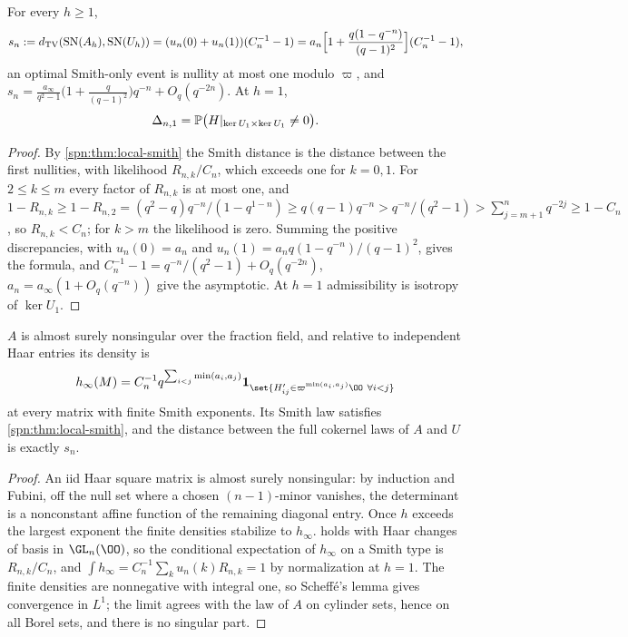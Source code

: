 \begin{corollary}\label{spn:cor:local-smith-tv}
For every $h\ge1$,
\[
 s_n:=d_{\mathrm{TV}}(\mathrm{SN}(A_h),\mathrm{SN}(U_h))=(u_n(0)+u_n(1))(C_n^{-1}-1)
 =a_n\Bigl[1+\frac{q(1-q^{-n})}{(q-1)^2}\Bigr](C_n^{-1}-1),
\]
an optimal Smith-only event is nullity at most one modulo $\varpi$, and
$s_n=\frac{a_\infty}{q^2-1}\bigl(1+\frac q{(q-1)^2}\bigr)q^{-n}+O_q(q^{-2n})$. At $h=1$,
\begin{equation}\label{spn:eq:local-field}
 \Delta_{n,1}=\mathbb{P}\bigl(H|_{\ker U_1\times\ker U_1}\ne0\bigr).
\end{equation}
\end{corollary}
\begin{proof}
By \cref{spn:thm:local-smith} the Smith distance is the distance between the first nullities, with
likelihood $R_{n,k}/C_n$, which exceeds one for $k=0,1$. For $2\le k\le m$ every factor of $R_{n,k}$ is
at most one, and
$1-R_{n,k}\ge1-R_{n,2}=(q^2-q)q^{-n}/(1-q^{1-n})\ge q(q-1)q^{-n}>q^{-n}/(q^2-1)>\sum_{j=m+1}^nq^{-2j}\ge1-C_n$,
so $R_{n,k}<C_n$; for $k>m$ the likelihood is zero. Summing the positive discrepancies, with
$u_n(0)=a_n$ and $u_n(1)=a_nq(1-q^{-n})/(q-1)^2$, gives the formula, and
$C_n^{-1}-1=q^{-n}/(q^2-1)+O_q(q^{-2n})$, $a_n=a_\infty(1+O_q(q^{-n}))$ give the asymptotic. At $h=1$
admissibility is isotropy of $\ker U_1$.
\end{proof}

\begin{proposition}\label{spn:prop:local-infinity}
$A$ is almost surely nonsingular over the fraction field, and relative to independent Haar entries
its density is
\[
 h_\infty(M)=C_n^{-1}q^{\sum_{i<j}\min(a_i,a_j)}\mathbf 1_{\set{H'_{ij}\in\varpi^{\min(a_i,a_j)}\OO\ \forall i<j}}
\]
at every matrix with finite Smith exponents. Its Smith law satisfies \cref{spn:thm:local-smith}, and
the distance between the full cokernel laws of $A$ and $U$ is exactly $s_n$.
\end{proposition}
\begin{proof}
An iid Haar square matrix is almost surely nonsingular: by induction and Fubini, off the null set
where a chosen $(n-1)$-minor vanishes, the determinant is a nonconstant affine function of the
remaining diagonal entry. Once $h$ exceeds the largest exponent the finite densities stabilize to
$h_\infty$.  holds with Haar changes of basis in $\GL_n(\OO)$, so the
conditional expectation of $h_\infty$ on a Smith type is $R_{n,k}/C_n$, and
$\int h_\infty=C_n^{-1}\sum_ku_n(k)R_{n,k}=1$ by normalization at $h=1$. The finite densities are
nonnegative with integral one, so Scheff\'e's lemma gives convergence in $L^1$; the limit agrees with
the law of $A$ on cylinder sets, hence on all Borel sets, and there is no singular part.
\end{proof}

